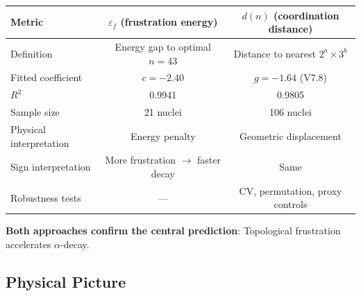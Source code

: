 \begin{center}
\begin{tabular}{lcc}
\hline
\textbf{Metric} & $\varepsilon_f$ \textbf{(frustration energy)} & $d(n)$ \textbf{(coordination distance)} \\
\hline
Definition & Energy gap to optimal $n=43$ & Distance to nearest $2^a \times 3^b$ \\
Fitted coefficient & $c = -2.40$ & $g = -1.64$ (V7.8) \\
$R^2$ & 0.9941 & 0.9805 \\
Sample size & 21 nuclei & 106 nuclei \\
Physical interpretation & Energy penalty & Geometric displacement \\
Sign interpretation & More frustration $\to$ faster decay & Same \\
Robustness tests & --- & CV, permutation, proxy controls \\
\hline
\end{tabular}
\end{center}

\textbf{Both approaches confirm the central prediction}: Topological frustration accelerates $\alpha$-decay.

\subsection{Physical Picture}
\label{subsec:m6-physical-picture}

